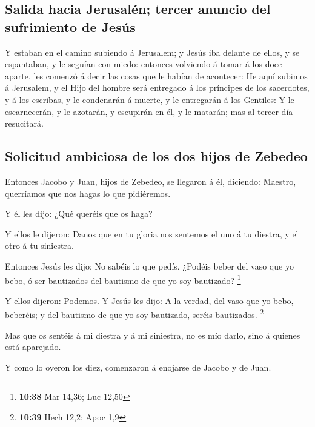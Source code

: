 \hypertarget{salida-hacia-jerusaluxe9n-tercer-anuncio-del-sufrimiento-de-jesuxfas}{%
\subsection{Salida hacia Jerusalén; tercer anuncio del sufrimiento de
Jesús}\label{salida-hacia-jerusaluxe9n-tercer-anuncio-del-sufrimiento-de-jesuxfas}}

 Y estaban en el camino subiendo á Jerusalem; y Jesús iba
delante de ellos, y se espantaban, y le seguían con miedo: entonces
volviendo á tomar á los doce aparte, les comenzó á decir las cosas que
le habían de acontecer:  He aquí subimos á Jerusalem, y
el Hijo del hombre será entregado á los príncipes de los sacerdotes, y á
los escribas, y le condenarán á muerte, y le entregarán á los Gentiles:
 Y le escarnecerán, y le azotarán, y escupirán en él, y
le matarán; mas al tercer día resucitará.

\hypertarget{solicitud-ambiciosa-de-los-dos-hijos-de-zebedeo}{%
\subsection{Solicitud ambiciosa de los dos hijos de
Zebedeo}\label{solicitud-ambiciosa-de-los-dos-hijos-de-zebedeo}}

 Entonces Jacobo y Juan, hijos de Zebedeo, se llegaron á
él, diciendo: Maestro, querríamos que nos hagas lo que pidiéremos.

 Y él les dijo: ¿Qué queréis que os haga?

 Y ellos le dijeron: Danos que en tu gloria nos sentemos
el uno á tu diestra, y el otro á tu siniestra.

 Entonces Jesús les dijo: No sabéis lo que pedís. ¿Podéis
beber del vaso que yo bebo, ó ser bautizados del bautismo de que yo soy
bautizado? \footnote{\textbf{10:38} Mar 14,36; Luc 12,50}

 Y ellos dijeron: Podemos. Y Jesús les dijo: A la verdad,
del vaso que yo bebo, beberéis; y del bautismo de que yo soy bautizado,
seréis bautizados. \footnote{\textbf{10:39} Hech 12,2; Apoc 1,9}

 Mas que os sentéis á mi diestra y á mi siniestra, no es
mío darlo, sino á quienes está aparejado.

 Y como lo oyeron los diez, comenzaron á enojarse de
Jacobo y de Juan.

